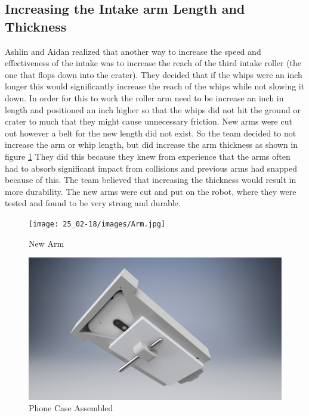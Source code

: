 \documentclass{article}
\begin{document}
\subsection{Increasing the Intake arm Length and Thickness}
Ashlin and Aidan realized that another way to increase the speed and effectiveness of the intake was to increase the reach of the third intake roller (the one that flops down into the crater). They decided that if the whips were an inch longer this would significantly increase the reach of the whips while not slowing it down. In order for this to work the roller arm need to be increase an inch in length and positioned an inch higher so that the whips did not hit the ground or crater to much that they might cause unnecessary friction. New arms were cut out however a belt for the new length did not exist. So the team decided to not increase the arm or whip length, but did increase the arm thickness as shown in figure \ref{fig:arm} They did this because they knew from experience that the arms often had to absorb significant impact from collisions and previous arms had snapped because of this. The team believed that increasing the thickness would result in more durability. The new arms were cut and put on the robot, where they were tested and found to be very strong and durable.

\begin{figure}
    \centering
    \texttt{[image: 25\_02-18/images/Arm.jpg]}
    \caption{New Arm}
    \label{fig:arm}
\end{figure}

\begin{figure}
    \centering
    \includegraphics[width= 0.5 \textwidth]{25_02-18/images/phonemount.png}
    \caption{Phone Case Assembled}
    \label{fig: phone case}
\end{figure}
\end{document}
